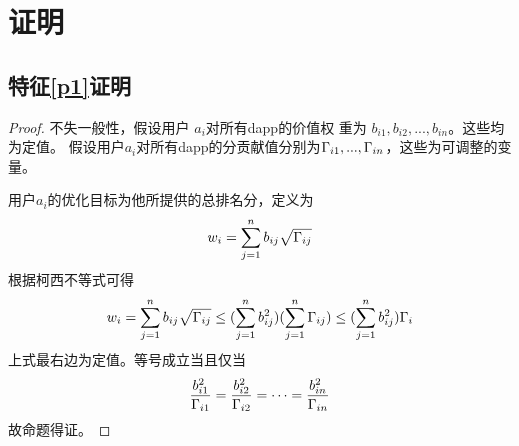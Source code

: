 \section{证明}
\subsection{特征\ref{p1}证明}
\label{subsection:proof1}
\begin{proof}

不失一般性，假设用户 $a_i$对所有dapp的价值权
重为 $b_{i1}, b_{i2}, ..., b_{in}$。这些均为定值。
假设用户$a_i$对所有dapp的分贡献值分别为$\Gamma_{i1},...,\Gamma_{in}$，这些为可调整的变量。

用户$a_i$的优化目标为他所提供的总排名分，定义为
$$w_i = \sum_{j=1}^n b_{ij}\sqrt{\Gamma_{ij}}$$
根据柯西不等式可得
$$w_i = \sum_{j=1}^n b_{ij}\sqrt{\Gamma_{ij}} \leq (\sum_{j=1}^n b_{ij}^2)(\sum_{j=1}^n \Gamma_{ij}) \leq (\sum_{j=1}^n b_{ij}^2)\Gamma_i$$
上式最右边为定值。等号成立当且仅当
$$\frac{b_{i1}^2}{\Gamma_{i1}}=\frac{b_{i2}^2}{\Gamma_{i2}}=\cdots=\frac{b_{in}^2}{\Gamma_{in}}$$
故命题得证。

\end{proof}
